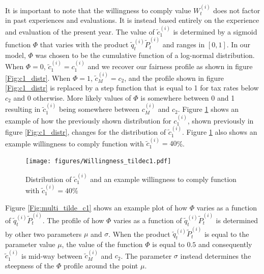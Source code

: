 \documentclass{NSF_proposal_mod}
\begin{document}
It is important to note that the willingness to comply value $W^{(i)}_t$ does not factor in past experiences and evaluations. It is instead based entirely on the experience and evaluation of the present year. The value of $\tilde{c}^{(i)}_1$ is determined by a sigmoid function $\Phi$ that varies with the product  $\tilde{q}^{(i)}_t\tilde{P}^{(i)}_t$ and ranges in $[0,1]$. In our model, $\Phi$ was chosen to be the cumulative function of a log-normal distribution.  When $\Phi=0$,  $\tilde{c}^{(i)}_1={c}^{(i)}_1$ and we recover our fairness profile as shown in figure \ref{Fig:c1_distr}. When $\Phi=1$,  $\tilde{c}^{(i)}_M={c}_2$, and the profile shown in figure \ref{Fig:c1_distr} is replaced by a step function that is equal to 1 for tax rates below $c_2$ and 0 otherwise. More likely values of $\Phi$ is somewhere between 0 and 1 resulting in $\tilde{c}^{(i)}_1$ being somewhere between $c_M^{(i)}$ and $c_2$. Figure \ref{Fig:Willingness_tildec1} shows an example of how the previously shown distribution for ${c}^{(i)}_1$, shown previously in figure \ref{Fig:c1_distr}, changes for the distribution of $\tilde{c}^{(i)}_1$.  Figure \ref{Fig:Willingness_tildec1} also shows  an example willingness to comply function with $\tilde{c}^{(i)}_1=40$\%. 
\begin{figure}[!h]
\centering
 \texttt{[image: figures/Willingness\_tildec1.pdf]} 
   \caption{Distribution of $\tilde{c}^{(i)}_1$ and an example willingness to comply function with $\tilde{c}^{(i)}_1=40$\%}  
   \label{Fig:Willingness_tildec1}
\end{figure}
Figure \ref{Fig:multi_tilde_c1} shows an example plot of how $\Phi$ varies as a function of $\tilde{q}^{(i)}_t\tilde{P}^{(i)}_t$. The profile of how $\Phi$ varies as a function of $\tilde{q}^{(i)}_t\tilde{P}^{(i)}_t$ is determined by other two parameters $\mu$ and $\sigma$. When the product 
$\tilde{q}^{(i)}_t\tilde{P}^{(i)}_t$  is equal to the parameter value $\mu$, the value of the function $\Phi$ is equal to $0.5$ and consequently $\tilde{c}^{(i)}_1$ is mid-way between $\tilde{c}^{(i)}_M$ and $c_2$.  The parameter $\sigma$ instead determines the steepness of the $\Phi$ profile around the point $\mu$. 
\end{document}
